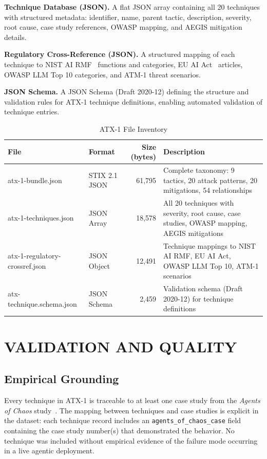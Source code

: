 \documentclass{IEEEoj-data}
\begin{document}
{\bf Technique Database (JSON).} A flat JSON array containing all 20 techniques with structured metadata: identifier, name, parent tactic, description, severity, root cause, case study references, OWASP mapping, and AEGIS mitigation details.

{\bf Regulatory Cross-Reference (JSON).} A structured mapping of each technique to NIST AI RMF~\cite{ref8} functions and categories, EU AI Act~\cite{ref9} articles, OWASP LLM Top 10 categories, and ATM-1 threat scenarios.

{\bf JSON Schema.} A JSON Schema (Draft 2020-12) defining the structure and validation rules for ATX-1 technique definitions, enabling automated validation of technique entries.


\begin{table}[!t]
\caption{ATX-1 File Inventory}
\label{tab:files}
\centering
\begin{tabular}{|l|l|r|p{6cm}|}
\hline
{\bf File} & {\bf Format} & {\bf Size (bytes)} & {\bf Description} \\
\hline
atx-1-bundle.json & STIX 2.1 JSON & 61,795 & Complete taxonomy: 9 tactics, 20 attack patterns, 20 mitigations, 54 relationships \\
atx-1-techniques.json & JSON Array & 18,578 & All 20 techniques with severity, root cause, case studies, OWASP mapping, AEGIS mitigations \\
atx-1-regulatory-crossref.json & JSON Object & 12,491 & Technique mappings to NIST AI RMF, EU AI Act, OWASP LLM Top 10, ATM-1 scenarios \\
atx-technique.schema.json & JSON Schema & 2,459 & Validation schema (Draft 2020-12) for technique definitions \\
\hline
\end{tabular}
\end{table}

\section*{VALIDATION AND QUALITY}

\subsection*{Empirical Grounding}

Every technique in ATX-1 is traceable to at least one case study from the {\it Agents of Chaos} study~\cite{ref4}. The mapping between techniques and case studies is explicit in the dataset: each technique record includes an \texttt{agents\_of\_chaos\_case} field containing the case study number(s) that demonstrated the behavior. No technique was included without empirical evidence of the failure mode occurring in a live agentic deployment.
\end{document}
